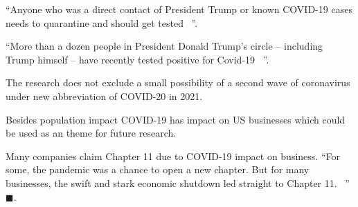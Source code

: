 \enquote{Anyone who was a direct contact of President Trump or known COVID-19 cases needs to quarantine and should get tested ~\cite{mn-100220}}.

\enquote{More than a dozen people in President Donald Trump's circle -- including Trump himself -- have recently tested positive for Covid-19 ~\cite{cnn-20201004}}.

The research does not exclude a small possibility of a second wave of coronavirus under new abbreviation of COVID-20 in 2021.

Besides population impact COVID-19 has impact on US businesses which could be used as an theme for future research.

Many companies claim Chapter 11 due to COVID-19 impact on business. \enquote{For some, the pandemic was a chance to open a new chapter. But for many businesses, the swift and stark economic shutdown led straight to Chapter 11.  ~\cite{fortune-20200804}} $\blacksquare$.



